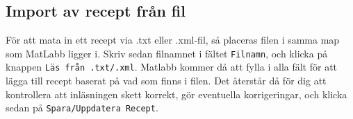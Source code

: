 \subsection{Import av recept från fil}
För att mata in ett recept via .txt eller .xml-fil, så placeras filen i samma map som MatLabb ligger i. Skriv sedan filnamnet i fältet \verb+Filnamn+, och klicka på knappen \verb+Läs från .txt/.xml+. Matlabb kommer då att fylla i alla fält för att lägga till recept baserat på vad som finns i filen. Det återstår då för dig att kontrollera att inläsningen skett korrekt, gör eventuella korrigeringar, och klicka sedan på \verb+Spara/Uppdatera Recept+.


